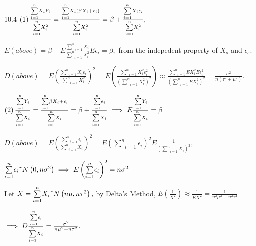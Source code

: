 \documentclass{article}
\begin{document}
10.4 $\left( 1\right) \frac{\underset{i=1}{\overset{n}{\sum }}X_{i}Y_{i}}{%
\underset{i=1}{\overset{n}{\sum }}X_{i}^{2}}=\frac{\underset{i=1}{\overset{n}%
{\sum }}X_{i}\left( \beta X_{i}+\epsilon _{i}\right) }{\underset{i=1}{%
\overset{n}{\sum }}X_{i}^{2}}=\beta +\frac{\underset{i=1}{\overset{n}{\sum }}%
X_{i}\epsilon _{i}}{\underset{i=1}{\overset{n}{\sum }}X_{i}^{2}},$

$E\left( above\right) =\beta +E\frac{\underset{i=1}{\overset{n}{\sum }}X_{i}%
}{\underset{i=1}{\overset{n}{\sum }}X_{i}^{2}}E\epsilon _{i}=\beta ,$ from
the indepedent property of $X_{s}$ and $\epsilon _{s}.$

$D\left( above\right) =E\left( \frac{\underset{i=1}{\overset{n}{\sum }}%
X_{i}\epsilon _{i}}{\underset{i=1}{\overset{n}{\sum }}X_{i}^{2}}\right)
^{2}=E\left( \frac{\underset{i=1}{\overset{n}{\sum }}X_{i}^{2}\epsilon
_{i}^{2}}{\left( \underset{i=1}{\overset{n}{\sum }}X_{i}^{2}\right) ^{2}}%
\right) \approx \frac{\underset{i=1}{\overset{n}{\sum }}EX_{i}^{2}E\epsilon
_{i}^{2}}{\left( \underset{i=1}{\overset{n}{\sum }}EX_{i}^{2}\right) ^{2}}=%
\frac{\sigma ^{2}}{n\left( \tau ^{2}+\mu ^{2}\right) }.$

$\left( 2\right) \frac{\underset{i=1}{\overset{n}{\sum }}Y_{i}}{\underset{i=1%
}{\overset{n}{\sum }}X_{i}}=\frac{\underset{i=1}{\overset{n}{\sum }}\beta
X_{i}+\epsilon _{i}}{\underset{i=1}{\overset{n}{\sum }}X_{i}}=\beta +\frac{%
\underset{i=1}{\overset{n}{\sum }}\epsilon _{i}}{\underset{i=1}{\overset{n}{%
\sum }}X_{i}}\implies E\frac{\underset{i=1}{\overset{n}{\sum }}Y_{i}}{%
\underset{i=1}{\overset{n}{\sum }}X_{i}}=\beta $

$D\left( above\right) =E\left( \frac{\underset{i=1}{\overset{n}{\sum }}%
\epsilon _{i}}{\underset{i=1}{\overset{n}{\sum }}X_{i}}\right) ^{2}=E\left( 
\underset{i=1}{\overset{n}{\sum }}\epsilon _{i}\right) ^{2}E\frac{1}{\left( 
\underset{i=1}{\overset{n}{\sum }}X_{i}\right) ^{2}},$

$\underset{i=1}{\overset{n}{\sum }}\epsilon _{i}\symbol{126}N\left(
0,n\sigma ^{2}\right) \implies E\left( \underset{i=1}{\overset{n}{\sum }}%
\epsilon _{i}\right) ^{2}=n\sigma ^{2}$

Let $X=\underset{i=1}{\overset{n}{\sum }}X_{i}\symbol{126}N\left( n\mu
,n\tau ^{2}\right) ,$ by Delta's Method, $E\left( \frac{1}{X^{2}}\right)
\approx \frac{1}{EX^{2}}=\frac{1}{n^{2}\mu ^{2}+n^{2}\tau ^{2}}$

$\implies D\frac{\underset{i=1}{\overset{n}{\sum }}\epsilon _{i}}{\underset{%
i=1}{\overset{n}{\sum }}X_{i}}=\frac{\sigma ^{2}}{n\mu ^{2}+n\tau ^{2}}.$
\end{document}
